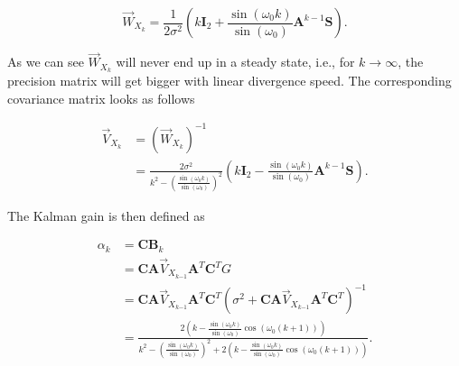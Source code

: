 \documentclass[11pt,a4paper,twoside]{report}
\newcommand{\messF}[3]{\overrightarrow{#1}_{{#2}_{k{#3}}}}
\newcommand{\mat}[1]{\mathbf{#1}}
\begin{document}
\begin{equation*}
	\messF{W}{X}{} = \frac{1}{2\sigma^2}\left(k\mat{I}_2 + \frac{\sin{\left(\omega_0k\right)}}{\sin{\left(\omega_0\right)}}\mat{A}^{k-1}\mat{S}\right) .
\end{equation*}

As we can see $\messF{W}{X}{}$ will never end up in a steady state, i.e., for $k \rightarrow \infty$, the precision matrix will get bigger with linear divergence speed. The corresponding covariance matrix looks as follows

\begin{align}
	\messF{V}{X}{} &= \left(\messF{W}{X}{}\right)^{-1} \\
	&= \frac{2\sigma^2}{k^2-\left(\frac{\sin{\left(\omega_0k\right)}}{\sin{\left(\omega_0\right)}}\right)^2}\left( k \mat{I}_2 - \frac{\sin{\left(\omega_0k\right)}}{\sin{\left(\omega_0\right)}}\mat{A}^{k-1}\mat{S}\right).
\end{align}

The Kalman gain is then defined as

\begin{align}
	\alpha_k &= \mat{CB}_k \\
	&= \mat{C}\mat{A}\messF{V}{X}{-1}\mat{A}^T\mat{C}^TG \\
	&= \mat{C}\mat{A}\messF{V}{X}{-1}\mat{A}^T\mat{C}^T\left( \sigma^2 + \mat{C} \mat{A}\messF{V}{X}{-1} \mat{A}^T\mat{C}^T \right)^{-1} \\
	&= \frac{2\left(k-\frac{\sin{\left(\omega_0k\right)}}{\sin{\left(\omega_0\right)}}\cos{\left(\omega_0\left(k+1\right)\right)}\right)}{k^2-\left(\frac{\sin{\left(\omega_0k\right)}}{\sin{\left(\omega_0\right)}}\right)^2 + 2\left(k-\frac{\sin{\left(\omega_0k\right)}}{\sin{\left(\omega_0\right)}}\cos{\left(\omega_0\left(k+1\right)\right)}\right)}.
\end{align}

\clearpage

%

\end{document}
